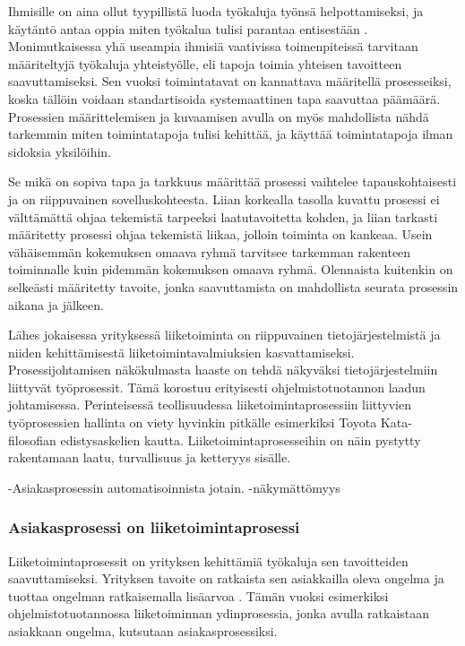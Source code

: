 \documentclass[finnish,12pt,a4paper,pdftex]{article}
\begin{document}
Ihmisille on aina ollut tyypillistä luoda työkaluja työnsä helpottamiseksi, ja käytäntö antaa oppia miten työkalua tulisi parantaa entisestään \citep{groover}. Monimutkaisessa yhä useampia ihmisiä vaativissa toimenpiteissä tarvitaan määriteltyjä työkaluja yhteistyölle, eli tapoja toimia yhteisen tavoitteen saavuttamiseksi. Sen vuoksi toimintatavat on kannattava määritellä prosesseiksi, koska tällöin voidaan standartisoida systemaattinen tapa saavuttaa päämäärä. Prosessien määrittelemisen ja kuvaamisen avulla on myös mahdollista nähdä tarkemmin miten toimintatapoja tulisi kehittää, ja käyttää toimintatapoja ilman sidoksia yksilöihin.

Se mikä on sopiva tapa ja tarkkuus määrittää prosessi vaihtelee tapauskohtaisesti ja on riippuvainen sovelluskohteesta. Liian korkealla tasolla kuvattu prosessi ei välttämättä ohjaa tekemistä tarpeeksi laatutavoitetta kohden, ja liian tarkasti määritetty prosessi ohjaa tekemistä liikaa, jolloin toiminta on kankeaa. Usein vähäisemmän kokemuksen omaava ryhmä tarvitsee tarkemman rakenteen toiminnalle kuin pidemmän kokemuksen omaava ryhmä. Olennaista kuitenkin on selkeästi määritetty tavoite, jonka saavuttamista on mahdollista seurata prosessin aikana ja jälkeen. \citep{ohjelmistotuotanto}

Lähes jokaisessa yrityksessä liiketoiminta on riippuvainen tietojärjestelmistä ja niiden kehittämisestä liiketoimintavalmiuksien kasvattamiseksi. Prosessijohtamisen näkökulmasta haaste on tehdä näkyväksi tietojärjestelmiin liittyvät työprosessit. Tämä korostuu erityisesti ohjelmistotuotannon laadun johtamisessa. Perinteisessä teollisuudessa liiketoimintaprosessiin liittyvien työprosessien hallinta on viety hyvinkin pitkälle esimerkiksi Toyota Kata-filosofian edistysaskelien kautta. Liiketoimintaprosesseihin on näin pystytty rakentamaan laatu, turvallisuus ja ketteryys sisälle. 

-Asiakasprosessin automatisoinnista jotain.
-näkymättömyys

\subsubsection{Asiakasprosessi on liiketoimintaprosessi}

Liiketoimintaprosessit on yrityksen kehittämiä työkaluja sen tavoitteiden saavuttamiseksi. Yrityksen tavoite on ratkaista sen asiakkailla oleva ongelma ja tuottaa ongelman ratkaisemalla lisäarvoa \citep{teollisuustalous}. Tämän vuoksi esimerkiksi ohjelmistotuotannossa liiketoiminnan ydinprosessia, jonka avulla ratkaistaan asiakkaan ongelma, kutsutaan asiakasprosessiksi.
\end{document}
